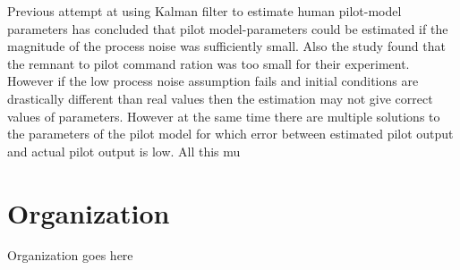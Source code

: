  Previous attempt at using Kalman filter\cite{schiess1975kalman} to estimate human pilot-model parameters has concluded that pilot model-parameters could be estimated if the magnitude of the process noise was sufficiently small. Also the study found that the remnant to pilot command ration was too small for their experiment. However if the low process noise assumption fails and initial conditions are drastically different than real values then the estimation may not give correct values of parameters. However at the same time there are multiple solutions to the parameters of the pilot model for which error between estimated pilot output and actual pilot output is low. All this mu


\section{Organization}
Organization goes here

